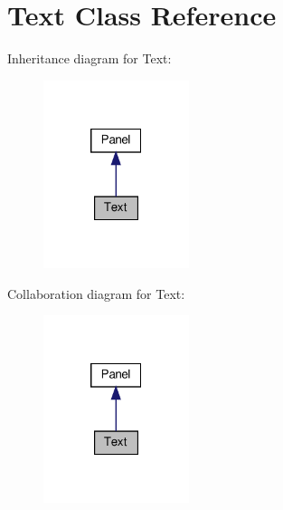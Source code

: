 \hypertarget{classText}{}\section{Text Class Reference}
\label{classText}


Inheritance diagram for Text\+:
\nopagebreak
\begin{figure}[H]
\begin{center}
\leavevmode
\includegraphics[width=121pt]{classText__inherit__graph}
\end{center}
\end{figure}


Collaboration diagram for Text\+:
\nopagebreak
\begin{figure}[H]
\begin{center}
\leavevmode
\includegraphics[width=121pt]{classText__coll__graph}
\end{center}
\end{figure}
